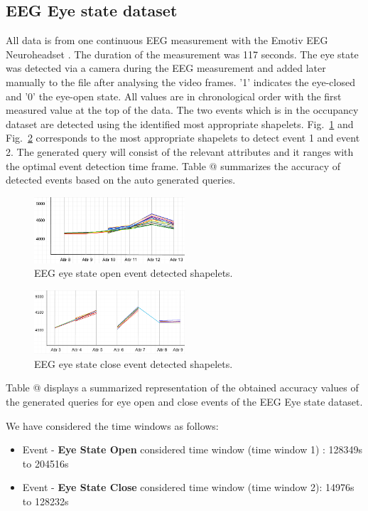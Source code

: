 \documentclass[conference]{IEEEtran}  %
\makeatletter
\newcommand*{\rom}[1]{\expandafter\@slowromancap\romannumeral #1@}
\makeatother
\begin{document}
\subsection{EEG Eye state dataset}
All data is from one continuous EEG measurement with the Emotiv EEG Neuroheadset \cite{IEEEexample:EEG}. The duration of the measurement was 117 seconds. The eye state was detected via a camera during the EEG measurement and added later manually to the file after analysing the video frames. '1' indicates the eye-closed and '0' the eye-open state. All values are in chronological order with the first measured value at the top of the data. The two events which is in the occupancy dataset are detected using the identified most appropriate shapelets. Fig.~\ref{fig:EEGEvent1} and Fig.~\ref{fig:EEGevent2} corresponds to the most appropriate shapelets to detect event 1 and event 2. The generated query will consist of the relevant attributes and it ranges with the optimal event detection time frame. Table \rom{2} summarizes the accuracy of detected events based on the auto generated queries.

\begin{figure}[h!]
\includegraphics[width=0.5\textwidth]{EEG_event1.png}
\caption{EEG eye state open event detected shapelets.}
\label{fig:EEGEvent1}
\end{figure}

\begin{figure}[h!]
\includegraphics[width=0.5\textwidth]{EEG_event2.png}
\caption{EEG eye state close event detected shapelets.}
\label{fig:EEGevent2}
\end{figure}

Table \rom{2} displays a summarized representation of the obtained accuracy values of the generated queries for eye open and close events of the EEG Eye state dataset.

We have considered the time windows as follows:
\begin{itemize}
\item Event - \textbf{Eye State Open} considered time window (time window 1) : 128349s to 204516s
\item Event - \textbf{Eye State Close} considered time window (time window 2):
14976s to 128232s
\end{itemize}
\end{document}
